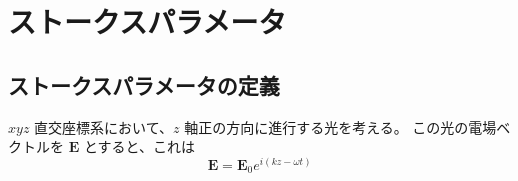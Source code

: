 \documentclass[../../main.tex]{subfiles}
\begin{document}
\chapter{ストークスパラメータ}
\label{chap:stokes}
\section{ストークスパラメータの定義}
\label{sec:stokes}
$xyz$ 直交座標系において、$z$ 軸正の方向に進行する光を考える。
この光の電場ベクトルを $\bm{E}$ とすると、これは
\begin{equation}
    \bm{E} = \bm{E}_0 e^{i(kz-\omega t)}
\end{equation}
\end{document}
